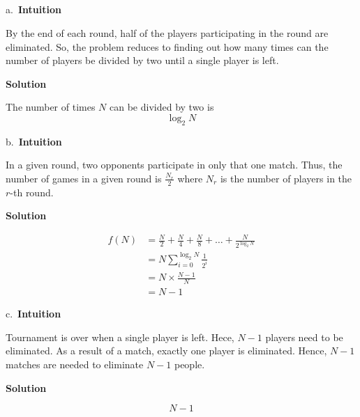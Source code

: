 \documentclass[]{book}
\begin{document}
\subsection{}\label{section-4}

a.~\textbf{Intuition}

By the end of each round, half of the players participating in the round
are eliminated. So, the problem reduces to finding out how many times
can the number of players be divided by two until a single player is
left.

 \textbf{Solution}

The number of times \(N\) can be divided by two is \[\log_{2}{N}\]

b.~\textbf{Intuition}

In a given round, two opponents participate in only that one match.
Thus, the number of games in a given round is \(\frac{N_{r}}{2}\) where
\(N_{r}\) is the number of players in the \(r\)-th round.

 \textbf{Solution}

\begin{equation} 
  \begin{split}
   f(N) & = \frac{N}{2} + \frac{N}{4}  + \frac{N}{8} + \dots + \frac{N}{2^{\log_{2}{N}}}\\
   & =N \sum_{i=0}^{\log_{2}{N}} \frac{1}{2^{i}}\\
   & =N \times \frac{N-1}{N}\\
   & =N-1
  \end{split}
  \label{eq:var-beta}
  \end{equation}

c.~\textbf{Intuition}

Tournament is over when a single player is left. Hece, \(N-1\) players
need to be eliminated. As a result of a match, exactly one player is
eliminated. Hence, \(N-1\) matches are needed to eliminate \(N-1\)
people.

 \textbf{Solution}

\[ N-1 \]


\end{document}
